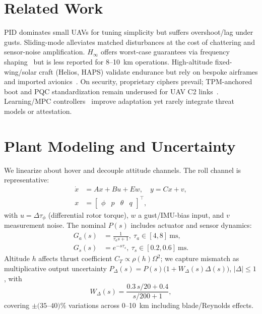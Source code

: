 \documentclass[conference]{IEEEtran}
\begin{document}
\section{Related Work}
PID dominates small UAVs for tuning simplicity but suffers overshoot/lag under gusts. Sliding-mode alleviates matched disturbances at the cost of chattering and sensor-noise amplification. $H_\infty$ offers worst-case guarantees via frequency shaping~\cite{zhou1996robust} but is less reported for 8--10~km operations. High-altitude fixed-wing/solar craft (Helios, HAPS) validate endurance but rely on bespoke airframes and imported avionics~\cite{nasahelios,jaxaHAPS}. On security, proprietary ciphers prevail; TPM-anchored boot and PQC standardization remain underused for UAV C2 links~\cite{pqcrypto2022}. Learning/MPC controllers~\cite{mpc2021,rluav2022} improve adaptation yet rarely integrate threat models or attestation.

\section{Plant Modeling and Uncertainty}
We linearize about hover and decouple attitude channels. The roll channel is representative:
\begin{align}
\dot{x}&=Ax+Bu+Ew,\quad y=Cx + v, \nonumber\\
x&=\begin{bmatrix}\phi & p & \theta & q\end{bmatrix}^\top,
\end{align}
with $u=\Delta \tau_\phi$ (differential rotor torque), $w$ a gust/IMU-bias input, and $v$ measurement noise. The nominal $P(s)$ includes actuator and sensor dynamics:
\begin{align}
G_a(s)&=\frac{1}{\tau_a s+1},\ \tau_a\in[4,8]~\mathrm{ms}, \\
G_s(s)&=e^{-s\tau_s},\ \tau_s\in[0.2,0.6]~\mathrm{ms}.
\end{align}
Altitude $h$ affects thrust coefficient $C_T\propto \rho(h) \Omega^2$; we capture mismatch as multiplicative output uncertainty
$P_\Delta(s)=P(s)\big(1+W_\Delta(s)\Delta(s)\big)$,
$|\Delta|\le1$, with
\begin{equation}
W_\Delta(s)=\frac{0.3\,s/20+0.4}{s/200+1},
\end{equation}
covering $\pm(35$--$40)\%$ variations across 0--10~km including blade/Reynolds effects.
\end{document}
